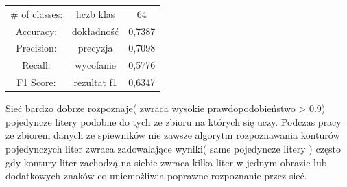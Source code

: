 \documentclass[a4paper,12pt]{article}
\begin{document}
            \begin{spacing}{1.5}
                \begin{center}
                \begin{tabular}{ c c c  }
                    \# of classes: &  liczb klas & 64 \\
                    Accuracy:  & dokładność & 0,7387  \\ 
                    Precision:  & precyzja & 0,7098 \\  
                    Recall: & wycofanie & 0,5776      \\
                    F1 Score: & rezultat f1 & 0,6347
                \end{tabular}
                \end{center}
            \end{spacing}
            
            Sieć bardzo dobrze rozpoznaje( zwraca wysokie prawdopodobieństwo > 0.9) pojedyncze litery podobne do tych ze zbioru na których się uczy. Podczas pracy ze zbiorem danych ze spiewników nie zawsze algorytm rozpoznawania konturów pojedynczych liter zwraca zadowalające wyniki( same pojedyncze litery ) często gdy kontury liter zachodzą na siebie zwraca kilka liter w jednym obrazie lub dodatkowych znaków co uniemożliwia poprawne rozpoznanie przez sieć. 
\end{document}
